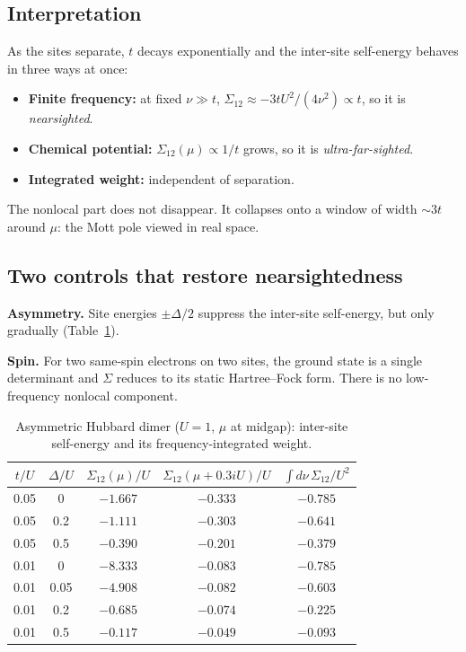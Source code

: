 \documentclass[11pt,a4paper]{article}
\begin{document}
\subsection{Interpretation}
As the sites separate, $t$ decays exponentially and the inter-site self-energy behaves in three ways at once:
\begin{itemize}
\item \textbf{Finite frequency:} at fixed $\nu\gg t$, $\Sigma_{12}\approx-3tU^2/(4\nu^2)\propto t$, so it is \emph{nearsighted}.
\item \textbf{Chemical potential:} $\Sigma_{12}(\mu)\propto 1/t$ grows, so it is \emph{ultra-far-sighted}.
\item \textbf{Integrated weight:} independent of separation.
\end{itemize}
The nonlocal part does not disappear. It collapses onto a window of width $\sim3t$ around $\mu$: the Mott pole viewed in real space.

\subsection{Two controls that restore nearsightedness}
\textbf{Asymmetry.} Site energies $\pm\Delta/2$ suppress the inter-site self-energy, but only gradually (Table~\ref{tab:asym}).

\textbf{Spin.} For two same-spin electrons on two sites, the ground state is a single determinant and $\Sigma$ reduces to its static Hartree--Fock form. There is no low-frequency nonlocal component.

\begin{table}[h]
\centering\small
\caption{Asymmetric Hubbard dimer ($U=1$, $\mu$ at midgap): inter-site self-energy and its frequency-integrated weight.}\label{tab:asym}
\begin{tabular}{ccccc}
\toprule
$t/U$ & $\Delta/U$ & $\Sigma_{12}(\mu)/U$ & $\Sigma_{12}(\mu+0.3iU)/U$ & $\int d\nu\,\Sigma_{12}/U^2$\\
\midrule
0.05 & 0    & $-1.667$ & $-0.333$ & $-0.785$\\
0.05 & 0.2  & $-1.111$ & $-0.303$ & $-0.641$\\
0.05 & 0.5  & $-0.390$ & $-0.201$ & $-0.379$\\
0.01 & 0    & $-8.333$ & $-0.083$ & $-0.785$\\
0.01 & 0.05 & $-4.908$ & $-0.082$ & $-0.603$\\
0.01 & 0.2  & $-0.685$ & $-0.074$ & $-0.225$\\
0.01 & 0.5  & $-0.117$ & $-0.049$ & $-0.093$\\
\bottomrule
\end{tabular}
\end{table}
\end{document}

